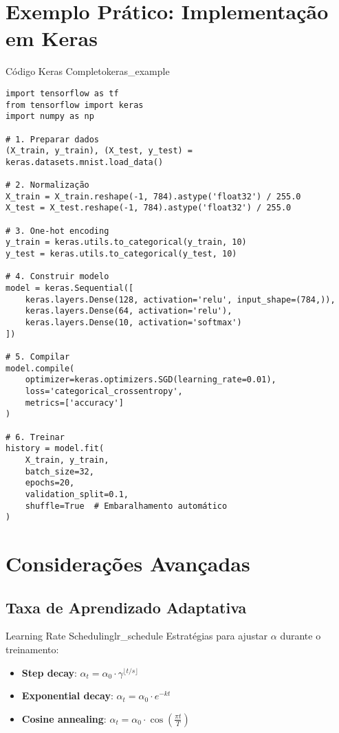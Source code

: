\documentclass[a4paper,12pt]{article}
\begin{document}
\section{Exemplo Prático: Implementação em Keras}

\begin{exemplo}{Código Keras Completo}{keras_example}
\begin{verbatim}
import tensorflow as tf
from tensorflow import keras
import numpy as np

# 1. Preparar dados
(X_train, y_train), (X_test, y_test) = keras.datasets.mnist.load_data()

# 2. Normalização
X_train = X_train.reshape(-1, 784).astype('float32') / 255.0
X_test = X_test.reshape(-1, 784).astype('float32') / 255.0

# 3. One-hot encoding
y_train = keras.utils.to_categorical(y_train, 10)
y_test = keras.utils.to_categorical(y_test, 10)

# 4. Construir modelo
model = keras.Sequential([
    keras.layers.Dense(128, activation='relu', input_shape=(784,)),
    keras.layers.Dense(64, activation='relu'),
    keras.layers.Dense(10, activation='softmax')
])

# 5. Compilar
model.compile(
    optimizer=keras.optimizers.SGD(learning_rate=0.01),
    loss='categorical_crossentropy',
    metrics=['accuracy']
)

# 6. Treinar
history = model.fit(
    X_train, y_train,
    batch_size=32,
    epochs=20,
    validation_split=0.1,
    shuffle=True  # Embaralhamento automático
)
\end{verbatim}
\end{exemplo}

\section{Considerações Avançadas}

\subsection{Taxa de Aprendizado Adaptativa}

\begin{observacao}{Learning Rate Scheduling}{lr_schedule}
Estratégias para ajustar $\alpha$ durante o treinamento:
\begin{itemize}
    \item \textbf{Step decay}: $\alpha_t = \alpha_0 \cdot \gamma^{\lfloor t/s \rfloor}$
    \item \textbf{Exponential decay}: $\alpha_t = \alpha_0 \cdot e^{-kt}$
    \item \textbf{Cosine annealing}: $\alpha_t = \alpha_0 \cdot \cos(\frac{\pi t}{T})$
\end{itemize}
\end{observacao}
\end{document}
